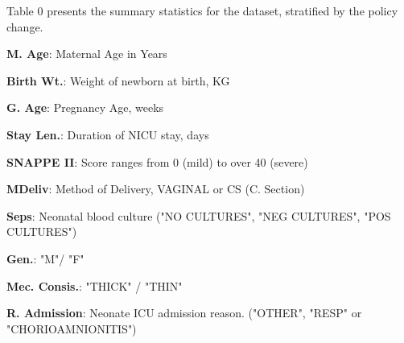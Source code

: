 \documentclass[11pt]{article}
\begin{document}
\begin{table}[h]
\caption{Selected descriptive statistics of the dataset stratified by policy change}
\label{table:descriptive}
\begin{threeparttable}
\renewcommand{\TPTminimum}{\linewidth}
\begin{tablenotes}
\footnotesize
\item Table 0 presents the summary statistics for the dataset, stratified by the policy change.
\item \textbf{M. Age}: Maternal Age in Years
\item \textbf{Birth Wt.}: Weight of newborn at birth, KG
\item \textbf{G. Age}: Pregnancy Age, weeks
\item \textbf{Stay Len.}: Duration of NICU stay, days
\item \textbf{SNAPPE II}: Score ranges from 0 (mild) to over 40 (severe)
\item \textbf{MDeliv}: Method of Delivery, VAGINAL or CS (C. Section)
\item \textbf{Seps}: Neonatal blood culture ("NO CULTURES", "NEG CULTURES", "POS CULTURES")
\item \textbf{Gen.}: "M"/ "F"
\item \textbf{Mec. Consis.}: "THICK" / "THIN"
\item \textbf{R. Admission}: Neonate ICU admission reason. ("OTHER", "RESP" or "CHORIOAMNIONITIS")
\end{tablenotes}
\end{threeparttable}
\end{table}
\end{document}
